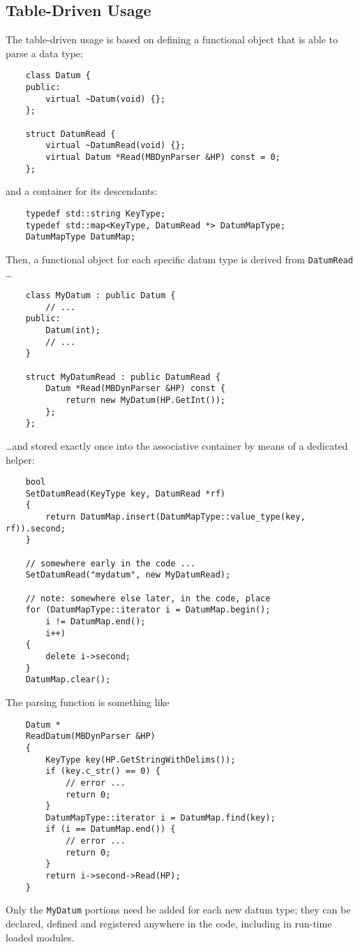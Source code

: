 \documentclass[10pt,dvips,fleqn,subeqn]{report}
\begin{document}
\subsection{Table-Driven Usage}
The table-driven usage is based on defining a functional object 
that is able to parse a data type:
\begin{verbatim}
    class Datum {
    public:
        virtual ~Datum(void) {};
    };

    struct DatumRead {
        virtual ~DatumRead(void) {};
        virtual Datum *Read(MBDynParser &HP) const = 0;
    };
\end{verbatim}
and a container for its descendants:
\begin{verbatim}
    typedef std::string KeyType;
    typedef std::map<KeyType, DatumRead *> DatumMapType;
    DatumMapType DatumMap;
\end{verbatim}
Then, a functional object for each specific datum type is derived from
\texttt{DatumRead} \ldots
\begin{verbatim}
    class MyDatum : public Datum {
        // ...
    public:
        Datum(int);
        // ...
    }

    struct MyDatumRead : public DatumRead {
        Datum *Read(MBDynParser &HP) const {
            return new MyDatum(HP.GetInt());
        };
    };
\end{verbatim}
\ldots and stored exactly once into the associative container by means
of a dedicated helper:
\begin{verbatim}
    bool
    SetDatumRead(KeyType key, DatumRead *rf)
    {
        return DatumMap.insert(DatumMapType::value_type(key, rf)).second;
    }

    // somewhere early in the code ...
    SetDatumRead("mydatum", new MyDatumRead);

    // note: somewhere else later, in the code, place
    for (DatumMapType::iterator i = DatumMap.begin();
        i != DatumMap.end();
        i++)
    {
        delete i->second;
    }
    DatumMap.clear();
\end{verbatim}
The parsing function is something like
\begin{verbatim}
    Datum *
    ReadDatum(MBDynParser &HP)
    {
        KeyType key(HP.GetStringWithDelims());
        if (key.c_str() == 0) {
            // error ...
            return 0;
        }
        DatumMapType::iterator i = DatumMap.find(key);
        if (i == DatumMap.end()) {
            // error ...
            return 0;
        }
        return i->second->Read(HP);
    }
\end{verbatim}
Only the \texttt{MyDatum} portions need be added for each new datum type;
they can be declared, defined and registered anywhere in the code,
including in run-time loaded modules.
\end{document}

